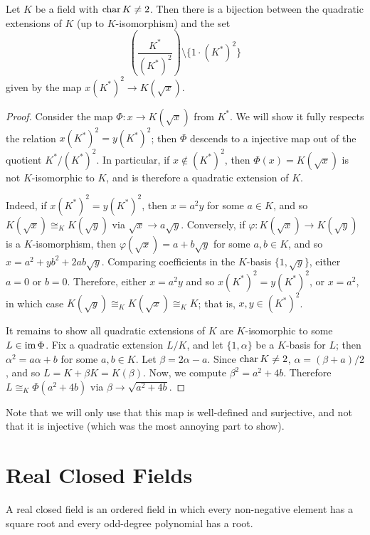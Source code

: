 \begin{lemma}
  \label{lem:deg_2_classify}
  Let $K$ be a field with $\operatorname{char} K\neq2$. Then there is a bijection between the quadratic extensions of $K$ (up to $K$-isomorphism) and the set
  \[\left(\frac{K^*}{{(K^*)^2}}\right)\setminus\{1\cdot(K^*)^2\}\]
  given by the map $x(K^*)^2\to K(\sqrt{x})$.
\end{lemma}
\begin{proof}
  Consider the map $\Phi:x\to K(\sqrt{x})$ from $K^*$. We will show it fully respects the relation $x(K^*)^2=y(K^*)^2$; then $\Phi$ descends to a injective map out of the quotient $K^*/(K^*)^2$. In particular, if $x\notin(K^*)^2$, then $\Phi(x)=K(\sqrt{x})$ is not $K$-isomorphic to $K$, and is therefore a quadratic extension of $K$.

  Indeed, if $x(K^*)^2=y(K^*)^2$, then $x=a^2y$ for some $a\in K$, and so $K(\sqrt{x})\cong_K K(\sqrt{y})$ via $\sqrt{x}\to a\sqrt{y}$. Conversely, if $\varphi:K(\sqrt{x})\to K(\sqrt{y})$ is a $K$-isomorphism, then $\varphi(\sqrt{x})=a+b\sqrt{y}$ for some $a,b\in K$, and so $x=a^2+yb^2+2ab\sqrt{y}$. Comparing coefficients in the $K$-basis $\{1,\sqrt{y}\}$, either $a=0$ or $b=0$. Therefore, either $x=a^2y$ and so $x(K^*)^2=y(K^*)^2$, or $x=a^2$, in which case $K(\sqrt{y})\cong_K K(\sqrt{x})\cong_K K$; that is, $x,y\in(K^*)^2$.

  It remains to show all quadratic extensions of $K$ are $K$-isomorphic to some $L\in\operatorname{im}\Phi$. Fix a quadratic extension $L/K$, and let $\{1,\alpha\}$ be a $K$-basis for $L$; then $\alpha^2=a\alpha+b$ for some $a,b\in K$. Let $\beta=2\alpha-a$. Since $\operatorname{char} K\neq 2$, $\alpha=(\beta+a)/2$, and so $L=K+\beta K=K(\beta)$. Now, we compute $\beta^2=a^2+4b$. Therefore $L\cong_K\Phi(a^2+4b)$ via $\beta\to\sqrt{a^2+4b}$.
\end{proof}

Note that we will only use that this map is well-defined and surjective, and not that it is injective (which was the most annoying part to show).

\section{Real Closed Fields}

\begin{definition}
  A real closed field is an ordered field in which every non-negative element has a square root and every odd-degree polynomial has a root.
\end{definition}

